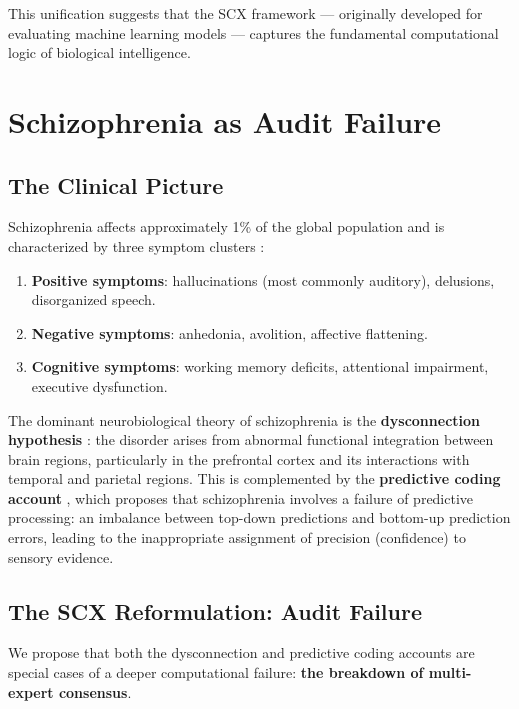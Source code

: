 \documentclass[12pt,a4paper]{article}
\theoremstyle{remark}
\newcommand{\SCX}{\textsf{SCX}}
\begin{document}
This unification suggests that the \SCX{} framework --- originally developed
for evaluating machine learning models --- captures the fundamental
computational logic of biological intelligence.

\section{Schizophrenia as Audit Failure}
\label{sec:schizophrenia}

\subsection{The Clinical Picture}

Schizophrenia affects approximately 1\% of the global population and is
characterized by three symptom clusters \cite{APA2013}:
\begin{enumerate}[label=(\roman*)]
    \item \textbf{Positive symptoms}: hallucinations (most commonly auditory),
          delusions, disorganized speech.
    \item \textbf{Negative symptoms}: anhedonia, avolition, affective flattening.
    \item \textbf{Cognitive symptoms}: working memory deficits, attentional
          impairment, executive dysfunction.
\end{enumerate}

The dominant neurobiological theory of schizophrenia is the \textbf{dysconnection
hypothesis} \cite{friston1998dysconnection, friston2016dysconnection}: the
disorder arises from abnormal functional integration between brain regions,
particularly in the prefrontal cortex and its interactions with temporal and
parietal regions. This is complemented by the \textbf{predictive coding account}
\cite{fletcher2009perceiving, adams2013computational}, which proposes that
schizophrenia involves a failure of predictive processing: an imbalance
between top-down predictions and bottom-up prediction errors, leading to the
inappropriate assignment of precision (confidence) to sensory evidence.

\subsection{The SCX Reformulation: Audit Failure}

We propose that both the dysconnection and predictive coding accounts are
special cases of a deeper computational failure: \textbf{the breakdown of
multi-expert consensus}.
\end{document}
